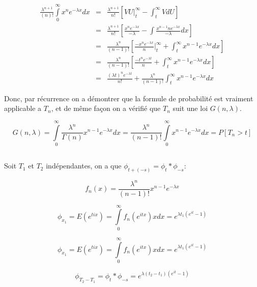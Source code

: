 \documentclass[a4paper]{article}
\begin{document}
\begin{eqnarray*}
\frac{\lambda^{n+1}}{(n)!}\int\limits_0^\infty x^{n}e^{-\lambda
  x}dx &=& \frac{\lambda^{n+1}}{n!}[VU|_t^\infty - \int_t^\infty VdU] \\
& =&\frac{\lambda^{n+1}}{n!}[\frac{x^n    e^{-\lambda     x}}{-\lambda}    -    \int
\frac{x^{n-1}n e^{-\lambda x}}{-\lambda}dx] \\
& =&  \frac{\lambda^{n}}{(n-1)!}[\frac{-x^n e^{-\lambda x}}{n}|_t^\infty +
\int_t^\infty{x^{n-1} e^{-\lambda x}}dx] \\
& =&  \frac{\lambda^{n}}{(n-1)!}[\frac{-t^n e^{-\lambda t}}{n} +
\int_t^\infty{x^{n-1} e^{-\lambda x}}dx] \\
& =& \frac{(\lambda t)^n e^{-\lambda t}}{n!} +
\frac{\lambda^{n}}{(n-1)!}\int_t^\infty{x^{n-1} e^{-\lambda x}}dx
\end{eqnarray*}

Donc, par récurrence  on a démontrer que la formule  de probabilité est vraiment
applicable a $T_n$, et de même façon on a vérifié que $T_n$ suit une loi $G(n,\lambda)$.

\begin{equation}
G(n,\lambda)= \int\limits_0^\infty \frac{\lambda^{n}}{\Gamma (n)}x^{n-1}e^{-\lambda x}dx=\frac{\lambda^{n}}{(n-1)!}\int\limits_0^\infty x^{n-1}e^{-\lambda x}dx=P[T_n > t]
\end{equation}


\subsection{}
Soit $T_1$ et $T_2$ indépendantes, on a que $\phi_{t+(-s)}=\phi_t*\phi_{-s}$:

\begin{equation}
f_n(x)=\frac{\lambda^{n}}{(n-1)!}x^{n-1}e^{-\lambda x}
\end{equation}

\begin{equation}
\phi_{x_1}=E(e^{tix})=\int\limits_0^\infty f_n(e^{itx})xdx=e^{\lambda t_1(e^{it}-1)}
\end{equation}

\begin{equation}
\phi_{x_1}=E(e^{tix})=\int\limits_0^\infty f_n(e^{itx})xdx=e^{\lambda t_1(e^{it}-1)}
\end{equation}

\begin{equation}
\phi_{T_2-T_1}=\phi_t*\phi_{-s}=e^{\lambda (t_2-t_1)(e^{it}-1)}
\end{equation}
\end{document}
